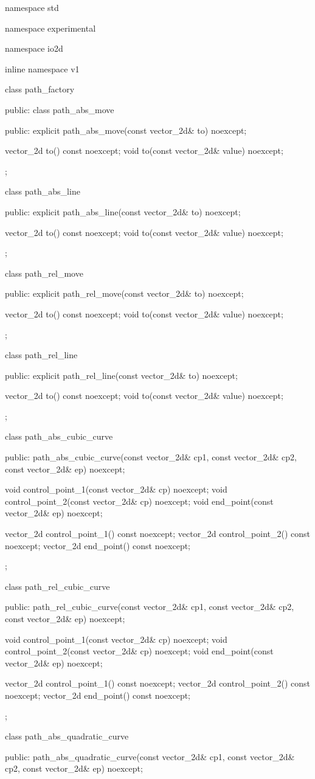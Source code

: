 \begin{codeblock}
namespace std { namespace experimental { namespace io2d { inline namespace v1 {
  class path_factory {
  public:
    class path_abs_move {
    public:
      explicit path_abs_move(const vector_2d& to) noexcept;
      
      vector_2d to() const noexcept;
      void to(const vector_2d& value) noexcept;
    };
    
    class path_abs_line {
    public:
      explicit path_abs_line(const vector_2d& to) noexcept;
      
      vector_2d to() const noexcept;
      void to(const vector_2d& value) noexcept;
    };
    
    class path_rel_move {
    public:
      explicit path_rel_move(const vector_2d& to) noexcept;
      
      vector_2d to() const noexcept;
      void to(const vector_2d& value) noexcept;
    };
    
    class path_rel_line {
    public:
      explicit path_rel_line(const vector_2d& to) noexcept;
      
      vector_2d to() const noexcept;
      void to(const vector_2d& value) noexcept;
    };
    
    class path_abs_cubic_curve {
    public:
      path_abs_cubic_curve(const vector_2d& cp1, const vector_2d& cp2,
        const vector_2d& ep) noexcept;
      
      void control_point_1(const vector_2d& cp) noexcept;
      void control_point_2(const vector_2d& cp) noexcept;
      void end_point(const vector_2d& ep) noexcept;
      
      vector_2d control_point_1() const noexcept;
      vector_2d control_point_2() const noexcept;
      vector_2d end_point() const noexcept;
    };
    
    class path_rel_cubic_curve {
    public:
      path_rel_cubic_curve(const vector_2d& cp1, const vector_2d& cp2,
        const vector_2d& ep) noexcept;
      
      void control_point_1(const vector_2d& cp) noexcept;
      void control_point_2(const vector_2d& cp) noexcept;
      void end_point(const vector_2d& ep) noexcept;
      
      vector_2d control_point_1() const noexcept;
      vector_2d control_point_2() const noexcept;
      vector_2d end_point() const noexcept;
    };
    
    class path_abs_quadratic_curve {
    public:
      path_abs_quadratic_curve(const vector_2d& cp1, const vector_2d& cp2,
        const vector_2d& ep) noexcept;
    
}}}}}}
\end{codeblock}
